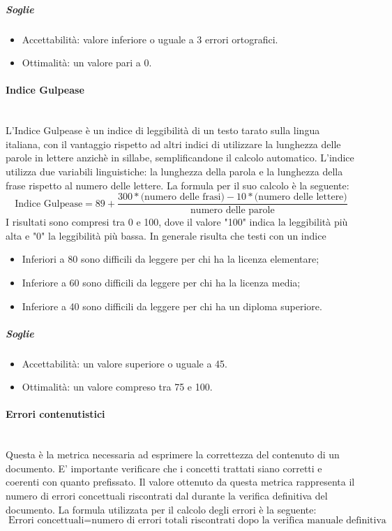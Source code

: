 \subparagraph{Soglie}
\begin{itemize}
\item Accettabilità: valore inferiore o uguale a 3 errori ortografici.
\item Ottimalità: un valore pari a 0.
\end{itemize}

\paragraph{Indice Gulpease}
\label{AppB:IndiceGulpease}
	~\\L'{Indice Gulpease} è un indice di leggibilità di un testo tarato sulla lingua italiana, con il vantaggio rispetto ad altri indici di utilizzare la lunghezza delle parole in lettere anzichè in sillabe, semplificandone il calcolo automatico. L'indice utilizza due variabili linguistiche: la lunghezza della parola e la lunghezza della frase rispetto al numero delle lettere.
\newline La formula per il suo calcolo è la seguente:
\begin{displaymath}
\mbox{{Indice Gulpease}}= 89+\frac{300*\mbox{(numero delle frasi)}-10*\mbox{(numero delle lettere)}}{\mbox{numero delle parole}}
\end{displaymath}
I risultati sono compresi tra 0 e 100, dove il valore "100" indica la leggibilità più alta e "0" la leggibilità più bassa. In generale risulta che testi con un indice
\begin{itemize}
	\item Inferiori a 80 sono difficili da leggere per chi ha la licenza elementare;
	\item Inferiore a 60 sono difficili da leggere per chi ha la licenza media;
	\item Inferiore a 40 sono difficili da leggere per chi ha un diploma superiore.
\end{itemize}

\subparagraph{Soglie}
\begin{itemize}
\item Accettabilità: un valore superiore o uguale a 45.
\item Ottimalità: un valore compreso tra 75 e 100.
\end{itemize}

\paragraph{Errori contenutistici}
\label{AppB:ErroriCont}
	~\\Questa è la metrica necessaria ad esprimere la correttezza del contenuto di un documento. E' importante verificare che i concetti trattati siano corretti e coerenti con quanto prefissato. Il valore ottenuto da questa metrica rappresenta il numero di errori concettuali riscontrati dal \ver{} durante la verifica definitiva del documento.
\newline La formula utilizzata per il calcolo degli errori è la seguente:
\begin{displaymath}
\mbox{Errori concettuali}={\mbox{numero di errori totali riscontrati dopo la verifica manuale definitiva}}
\end{displaymath}


